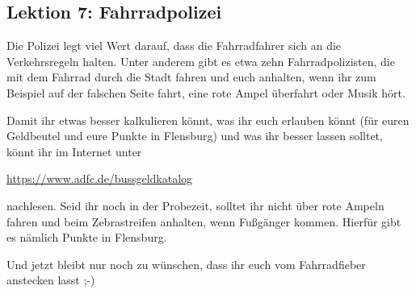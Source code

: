 \begin{multicols}{2}
\subsection{Lektion 7: Fahrradpolizei}
Die Polizei legt viel Wert darauf, dass die Fahrradfahrer sich an die Verkehrsregeln halten.
Unter anderem gibt es etwa zehn Fahrradpolizisten, die mit dem Fahrrad durch die Stadt fahren und euch anhalten, wenn ihr zum Beispiel auf der falschen Seite fahrt, eine rote Ampel überfahrt oder Musik hört.

Damit ihr etwas besser kalkulieren könnt, was ihr euch erlauben könnt (für euren Geldbeutel und eure Punkte in Flensburg) und was ihr besser lassen solltet, könnt ihr im Internet unter
\begin{center}
	\url{https://www.adfc.de/bussgeldkatalog}
\end{center}
nachlesen.
Seid ihr noch in der Probezeit, solltet ihr nicht über rote Ampeln fahren und beim Zebrastreifen anhalten, wenn Fußgänger kommen.
Hierfür gibt es nämlich Punkte in Flensburg.

Und jetzt bleibt nur noch zu wünschen, dass ihr euch vom Fahrradfieber anstecken lasst ;-)

\end{multicols}
